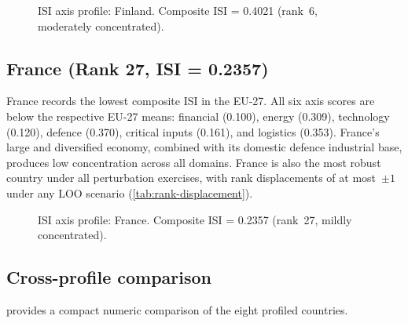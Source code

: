 \begin{figure}[htbp]
\centering

\caption{ISI axis profile: Finland.  Composite ISI = 0.4021
  (rank~6, moderately concentrated).}
\label{fig:radar-FI}
\end{figure}

\subsection{France (Rank 27, ISI = 0.2357)}

France records the lowest composite ISI in the EU-27.  All six
axis scores are below the respective EU-27 means: financial
(0.100), energy (0.309), technology (0.120), defence (0.370),
critical inputs (0.161), and logistics (0.353).  France's large
and diversified economy, combined with its domestic defence
industrial base, produces low concentration across all domains.
France is also the most robust country under all perturbation
exercises, with rank displacements of at most~$\pm 1$ under
any LOO scenario (\cref{tab:rank-displacement}).

\begin{figure}[htbp]
\centering

\caption{ISI axis profile: France.  Composite ISI = 0.2357
  (rank~27, mildly concentrated).}
\label{fig:radar-FR}
\end{figure}

\subsection{Cross-profile comparison}

 provides a compact numeric comparison
of the eight profiled countries.

